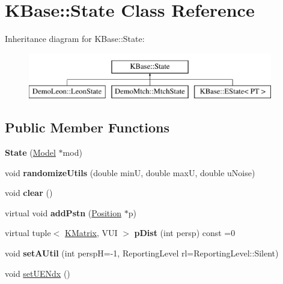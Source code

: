 \hypertarget{class_k_base_1_1_state}{\section{K\-Base\-:\-:State Class Reference}
\label{class_k_base_1_1_state}
}
Inheritance diagram for K\-Base\-:\-:State\-:\begin{figure}[H]
\begin{center}
\leavevmode
\includegraphics[height=2.000000cm]{class_k_base_1_1_state}
\end{center}
\end{figure}
\subsection*{Public Member Functions}
\begin{DoxyCompactItemize}
\item 
\hypertarget{class_k_base_1_1_state_a3df4aff41e3a45a940118eb3b5eb9e7f}{{\bfseries State} (\hyperlink{class_k_base_1_1_model}{Model} $\ast$mod)}\label{class_k_base_1_1_state_a3df4aff41e3a45a940118eb3b5eb9e7f}

\item 
\hypertarget{class_k_base_1_1_state_a707cd5aa36380ed9857006f1bd94ac82}{void {\bfseries randomize\-Utils} (double min\-U, double max\-U, double u\-Noise)}\label{class_k_base_1_1_state_a707cd5aa36380ed9857006f1bd94ac82}

\item 
\hypertarget{class_k_base_1_1_state_abbe1359b24e0bb85f3864b263642d7c7}{void {\bfseries clear} ()}\label{class_k_base_1_1_state_abbe1359b24e0bb85f3864b263642d7c7}

\item 
\hypertarget{class_k_base_1_1_state_ae2ca6cade9e2eebc0ae92f4d538cb7c3}{virtual void {\bfseries add\-Pstn} (\hyperlink{class_k_base_1_1_position}{Position} $\ast$p)}\label{class_k_base_1_1_state_ae2ca6cade9e2eebc0ae92f4d538cb7c3}

\item 
\hypertarget{class_k_base_1_1_state_ad0b47f5cba11043c02d16a6a51819c02}{virtual tuple$<$ \hyperlink{class_k_base_1_1_k_matrix}{K\-Matrix}, V\-U\-I $>$ {\bfseries p\-Dist} (int persp) const =0}\label{class_k_base_1_1_state_ad0b47f5cba11043c02d16a6a51819c02}

\item 
\hypertarget{class_k_base_1_1_state_a47fa7e79885216bb1bd2185aa54c935e}{void {\bfseries set\-A\-Util} (int persp\-H=-\/1, Reporting\-Level rl=Reporting\-Level\-::\-Silent)}\label{class_k_base_1_1_state_a47fa7e79885216bb1bd2185aa54c935e}

\item 
void \hyperlink{class_k_base_1_1_state_a263291175cbf35293c09784af03a480d}{set\-U\-E\-Ndx} ()
\end{DoxyCompactItemize}
